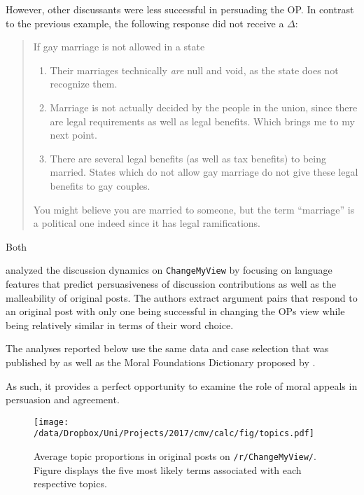 However, other discussants were less successful in persuading the OP. In contrast to the previous example, the following response did not receive a $\Delta$:
\begin{quote}\singlespacing
If gay marriage is not allowed in a state
\begin{enumerate}
\item Their marriages technically \textit{are} null and void, as the state does not recognize them.
\item Marriage is not actually decided by the people in the union, since there are legal requirements as well as legal benefits. Which brings me to my next point.
\item There are several legal benefits (as well as tax benefits) to being married. States which do not allow gay marriage do not give these legal benefits to gay couples.      
\end{enumerate}
You might believe you are married to someone, but the term ``marriage'' is a political one indeed since it has legal ramifications.
\end{quote}

Both




\citet{tan2016winning} analyzed the discussion dynamics on \texttt{ChangeMyView} by focusing on language features that predict persuasiveness of discussion contributions as well as the malleability of original posts. The authors extract argument pairs that respond to an original post with only one being successful in changing the OPs view while being relatively similar in terms of their word choice.



The analyses reported below use the same data and case selection that was published by \citet{tan2016winning} as well as the Moral Foundations Dictionary proposed by \citet{graham2009liberals}.

As such, it provides a perfect opportunity to examine the role of moral appeals in persuasion and agreement.


\begin{figure}[ht]
\centering
\texttt{[image: /data/Dropbox/Uni/Projects/2017/cmv/calc/fig/topics.pdf]}
\caption{Average topic proportions in original posts on \texttt{/r/ChangeMyView/}. Figure displays the five most likely terms associated with each respective topics.}
\end{figure}



